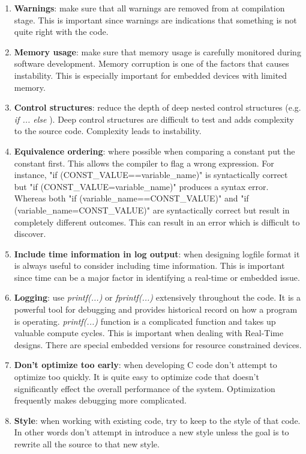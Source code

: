 \begin{enumerate}
\item \textbf{Warnings}: make sure that all warnings are removed from at compilation stage. This is important since warnings are indications that something is not quite right with the code. 

\item \textbf{Memory usage}: make sure that memory usage is carefully monitored during software development. Memory corruption is one of the factors that causes instability. This is especially important for embedded devices with limited memory.

\item \textbf{Control structures}: reduce the depth of deep nested control structures (e.g. \textit{if ... else }). Deep control structures are difficult to test and adds complexity to the source code. Complexity leads to instability.

\item \textbf{Equivalence ordering}: where possible when comparing a constant put the constant first. This allows the compiler to flag a wrong expression. For instance, "if (CONST\_VALUE==variable\_name)" is syntactically correct but "if (CONST\_VALUE=variable\_name)" produces a syntax error. Whereas both "if (variable\_name==CONST\_VALUE)" and "if (variable\_name=CONST\_VALUE)" are syntactically correct but result in completely different outcomes. This can result in an error which is difficult to discover. 

\item \textbf{Include time information in log output}: when designing logfile format it is always useful to consider including time information. This is important since time can be a major factor in identifying a real-time or embedded issue.

\item \textbf{Logging}: use \textit{printf(...)} or \textit{fprintf(...)} extensively throughout the code. It is a powerful tool for debugging and provides historical record on how a program is operating. \textit{printf(...)} function is a complicated function and takes up valuable compute cycles. This is important when dealing with Real-Time designs. There are special embedded versions for resource constrained devices.

\item \textbf{Don't optimize too early}: when developing C code don't attempt to optimize too quickly. It is quite easy to optimize code that doesn't significantly effect the overall performance of the system. Optimization frequently makes debugging more complicated.

\item \textbf{Style}: when working with existing code, try to keep to the style of that code. In other words don't attempt in introduce a new style unless the goal is to rewrite all the source to that new style.

\end{enumerate}

